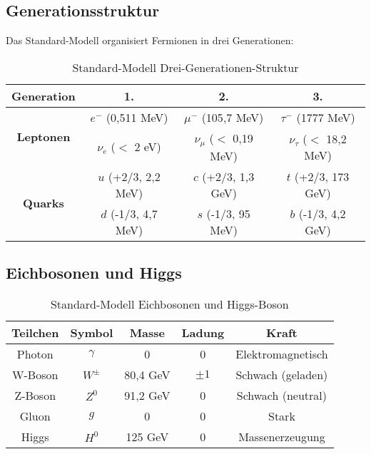 \documentclass[12pt,a4paper]{article}
\begin{document}
	\subsection{Generationsstruktur}
	
	Das Standard-Modell organisiert Fermionen in drei Generationen:
	
	\begin{table}[htbp]
		\centering
		\begin{tabular}{|c|c|c|c|}
			\hline
			\textbf{Generation} & \textbf{1.} & \textbf{2.} & \textbf{3.} \\
			\hline
			\hline
			\multirow{2}{*}{\textbf{Leptonen}} & $e^-$ (0{,}511 MeV) & $\mu^-$ (105{,}7 MeV) & $\tau^-$ (1777 MeV) \\
			& $\nu_e$ ($<$ 2 eV) & $\nu_\mu$ ($<$ 0{,}19 MeV) & $\nu_\tau$ ($<$ 18{,}2 MeV) \\
			\hline
			\multirow{2}{*}{\textbf{Quarks}} & $u$ (+2/3, 2{,}2 MeV) & $c$ (+2/3, 1{,}3 GeV) & $t$ (+2/3, 173 GeV) \\
			& $d$ (-1/3, 4{,}7 MeV) & $s$ (-1/3, 95 MeV) & $b$ (-1/3, 4{,}2 GeV) \\
			\hline
		\end{tabular}
		\caption{Standard-Modell Drei-Generationen-Struktur}
		\label{tab:sm_generations}
	\end{table}
	
	\subsection{Eichbosonen und Higgs}
	
	\begin{table}[htbp]
		\centering
		\begin{tabular}{|c|c|c|c|c|}
			\hline
			\textbf{Teilchen} & \textbf{Symbol} & \textbf{Masse} & \textbf{Ladung} & \textbf{Kraft} \\
			\hline
			\hline
			Photon & $\gamma$ & 0 & 0 & Elektromagnetisch \\
			W-Boson & $W^{\pm}$ & 80{,}4 GeV & $\pm 1$ & Schwach (geladen) \\
			Z-Boson & $Z^0$ & 91{,}2 GeV & 0 & Schwach (neutral) \\
			Gluon & $g$ & 0 & 0 & Stark \\
			Higgs & $H^0$ & 125 GeV & 0 & Massenerzeugung \\
			\hline
		\end{tabular}
		\caption{Standard-Modell Eichbosonen und Higgs-Boson}
		\label{tab:sm_bosons}
	\end{table}
	
\end{document}
